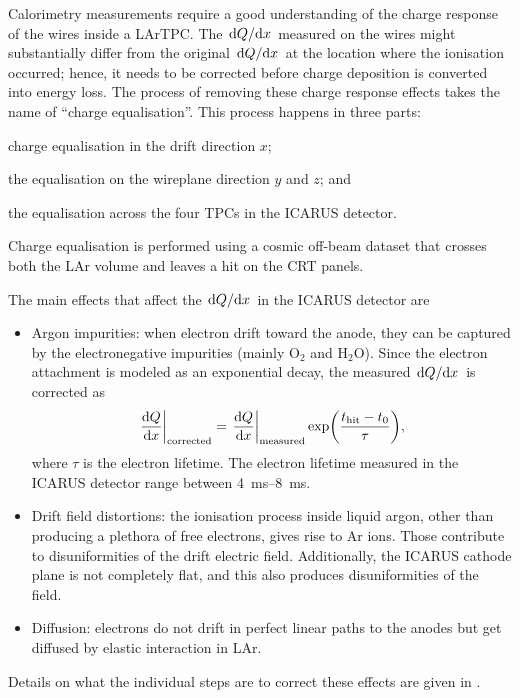 Calorimetry measurements require a good understanding of the charge response of the wires inside a LArTPC. The $\dv*{Q}{x}$ measured on the wires might substantially differ from the original $\dv*{Q}{x}$ at the location where the ionisation occurred; hence, it needs to be corrected before charge deposition is converted into energy loss. The process of removing these charge response effects takes the name of ``charge equalisation''. This process happens in three parts: \begin{inparaenum}
    \item charge equalisation in the drift direction $x$;
    \item the equalisation on the wireplane direction $y$ and $z$; and 
    \item the equalisation across the four TPCs in the ICARUS detector. 
\end{inparaenum} Charge equalisation is performed using a cosmic off-beam dataset that crosses both the LAr volume and leaves a hit on the CRT panels. 

The main effects that affect the $\dv*{Q}{x}$ in the ICARUS detector are \begin{itemize}
    \item Argon impurities: when electron drift toward the anode, they can be captured by the electronegative impurities (mainly $\mathrm{O_2}$ and $\mathrm{H_2O}$). Since the electron attachment is modeled as an exponential decay, the measured $\dv*{Q}{x}$ is corrected as \begin{equation}
        \eval{\dv{Q}{x}}_\mathrm{corrected} = \eval{\dv{Q}{x}}_\mathrm{measured} \exp(\frac{t_\mathrm{hit}-t_0}{\tau}),
    \end{equation} where $\tau$ is the electron lifetime. The electron lifetime measured in the ICARUS detector range between \qtyrange{4}{8}{\ms}. 

    \item Drift field distortions: the ionisation process inside liquid argon, other than producing a plethora of free electrons, gives rise to Ar ions. Those contribute to disuniformities of the drift electric field. Additionally, the ICARUS cathode plane is not completely flat, and this also produces disuniformities of the field. 

    \item Diffusion: electrons do not drift in perfect linear paths to the anodes but get diffused by elastic interaction in LAr. 
\end{itemize} Details on what the individual steps are to correct these effects are given in \cite{arteroponsStudyReconstructionNuMuCC}. 

